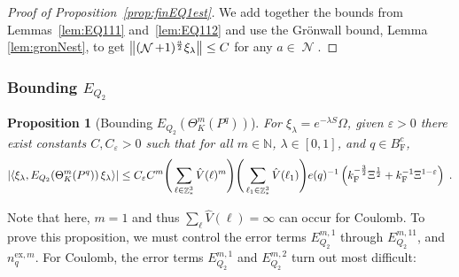 \documentclass[12pt,a4paper]{article}
\numberwithin{equation}{section}
\newcommand{\NNN}{\mathbb{N}}
\newcommand{\1}{\mathbb{I}}
\newcommand{\ex}{\mathrm{ex}}
\newcommand{\F}{\mathrm{F}}
\DeclareMathOperator{\Z}{\mathbb{Z}}
\DeclareMathOperator{\NN}{\mathcal{N}}
\newcommand{\half}{\frac{1}{2}}
\newcommand{\eva}[1]{\left\langle #1 \right\rangle}
\theoremstyle{plain}
\newtheorem{proposition}[theorem]{Proposition}
\theoremstyle{definition}
\theoremstyle{remark}
\theoremstyle{plain}
\theoremstyle{definition}
\theoremstyle{remark}
\begin{document}
\begin{proof}[Proof of Proposition~\ref{prop:finEQ1est}]
We add together the bounds from Lemmas~\ref{lem:EQ111} and~\ref{lem:EQ112} and use the Gr\"onwall bound, Lemma \ref{lem:gronNest}, to get $ \norm{(\NN+1)^{\frac{a}{2}} \xi_\lambda} \le C $ for any $ a \in \NN $.
\end{proof}






\subsubsection{Bounding $E_{Q_2}$}

\begin{proposition}[Bounding $E_{Q_2}(\Theta^m_{K}(P^q))$]\label{prop:finEQ2est}
For $\xi_\lambda = e^{-\lambda S} \Omega$, given $ \varepsilon > 0 $ there exist constants $ C, C_\varepsilon > 0 $ such that for all $ m \in \NNN $, $ \lambda \in [0,1] $, and $ q \in B_{\F}^c $,
\begin{equation}\label{eq:finEQ2est}
	\abs{\eva{\xi_\lambda, E_{Q_2}\!\left(\Theta^m_K(P^q)\right) \xi_\lambda}} 
	\leq C_\varepsilon C^m \Bigg(\sum\limits_{\ell \in \Z^3_*} \hat{V}(\ell)^m\Bigg)
		\Bigg( \sum\limits_{\ell_1 \in \Z^3_*} \hat{V}(\ell_1) \Bigg)
		e(q)^{-1} \left( k_{\F}^{-\frac{3}{2}} \Xi^\half
		+ k_{\F}^{-1} \Xi^{1-\varepsilon} \right) \;. \\
\end{equation}
\end{proposition}

\textcolor{green!30!black}{Note that here, $ m = 1 $ and thus $ \sum_\ell \hat{V}(\ell) = \infty $ can occur for Coulomb.} To prove this proposition, we must control the error terms $ E^{m,1}_{Q_2} $ through $ E^{m,11}_{Q_2} $, and $ n_q^{\ex,m} $. \textcolor{green!30!black}{For Coulomb, the error terms $ E^{m,1}_{Q_2} $ and $ E^{m,2}_{Q_2} $ turn out most difficult:}
\end{document}
